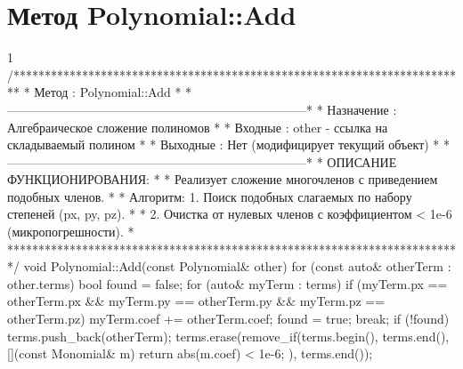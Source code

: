 \section{Метод Polynomial::Add}
\footnotesize
\begin{listing}{1}
/*************************************************************************
* Метод         : Polynomial::Add                                        *
*------------------------------------------------------------------------*
* Назначение    : Алгебраическое сложение полиномов                      *
* Входные       : other - ссылка на складываемый полином                 *
* Выходные      : Нет (модифицирует текущий объект)                      *
*------------------------------------------------------------------------*
* ОПИСАНИЕ ФУНКЦИОНИРОВАНИЯ:                                             *
* Реализует сложение многочленов с приведением подобных членов.           *
* Алгоритм: 1. Поиск подобных слагаемых по набору степеней (px, py, pz).  *
* 2. Очистка от нулевых членов с коэффициентом < 1e-6 (микропогрешности). *
*************************************************************************/
void Polynomial::Add(const Polynomial& other) {
    for (const auto& otherTerm : other.terms) {
        bool found = false;
        for (auto& myTerm : terms) {
            if (myTerm.px == otherTerm.px && myTerm.py == otherTerm.py && 
                myTerm.pz == otherTerm.pz) {
                myTerm.coef += otherTerm.coef; found = true; break;
            }
        }
        if (!found) terms.push_back(otherTerm);
    }
    terms.erase(remove_if(terms.begin(), terms.end(), 
        [](const Monomial& m) { return abs(m.coef) < 1e-6; }), 
        terms.end());
}
\end{listing}
\normalsize

\pagebreak

